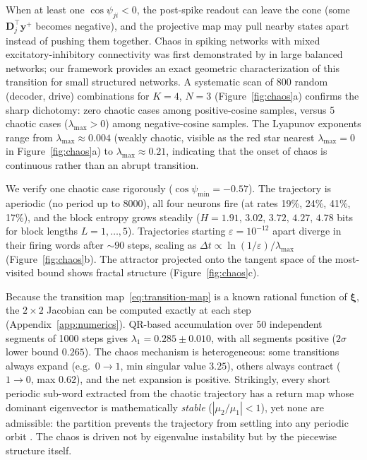 \documentclass[12pt]{article}
\newcommand{\vv}[1]{\mathbf{#1}}
\newcommand{\DD}{\vv{D}}
\newcommand{\yy}{\vv{y}}
\newcommand{\xxi}{\boldsymbol{\xi}}
\begin{document}
When at least one $\cos\psi_{ji}<0$, the post-spike readout can leave the cone (some $\DD_j^\top\yy^+$ becomes negative), and the projective map may pull nearby states apart instead of pushing them together. Chaos in spiking networks with mixed excitatory-inhibitory connectivity was first demonstrated by \citet{vreeswijk1996chaos} in large balanced networks; our framework provides an exact geometric characterization of this transition for small structured networks. A systematic scan of 800 random (decoder, drive) combinations for $K=4$, $N=3$ (Figure~\ref{fig:chaos}a) confirms the sharp dichotomy: zero chaotic cases among positive-cosine samples, versus 5 chaotic cases ($\lambda_{\max}>0$) among negative-cosine samples. The Lyapunov exponents range from $\lambda_{\max}\approx 0.004$ (weakly chaotic, visible as the red star nearest $\lambda_{\max}=0$ in Figure~\ref{fig:chaos}a) to $\lambda_{\max}\approx 0.21$, indicating that the onset of chaos is continuous rather than an abrupt transition.

We verify one chaotic case rigorously ($\cos\psi_{\min}=-0.57$). The trajectory is aperiodic (no period up to 8000), all four neurons fire (at rates 19\%, 24\%, 41\%, 17\%), and the block entropy grows steadily ($H=1.91,\,3.02,\,3.72,\,4.27,\,4.78$ bits for block lengths $L=1,\ldots,5$). Trajectories starting $\varepsilon=10^{-12}$ apart diverge in their firing words after ${\sim}90$ steps, scaling as $\Delta t\propto\ln(1/\varepsilon)/\lambda_{\max}$ (Figure~\ref{fig:chaos}b). The attractor projected onto the tangent space of the most-visited bound shows fractal structure (Figure~\ref{fig:chaos}c).

Because the transition map~\eqref{eq:transition-map} is a known rational function of $\xxi$, the $2\times 2$ Jacobian can be computed exactly at each step (Appendix~\ref{app:numerics}). QR-based accumulation over 50 independent segments of 1000 steps gives $\lambda_1=0.285\pm 0.010$, with all segments positive ($2\sigma$ lower bound $0.265$). The chaos mechanism is heterogeneous: some transitions always expand (e.g.\ $0\to 1$, min singular value $3.25$), others always contract ($1\to 0$, max $0.62$), and the net expansion is positive. Strikingly, every short periodic sub-word extracted from the chaotic trajectory has a return map whose dominant eigenvector is mathematically \emph{stable} ($|\mu_2/\mu_1|<1$), yet none are admissible: the partition prevents the trajectory from settling into any periodic orbit \citep{korn2003there,terada2024chaotic}. The chaos is driven not by eigenvalue instability but by the piecewise structure itself.
\end{document}
